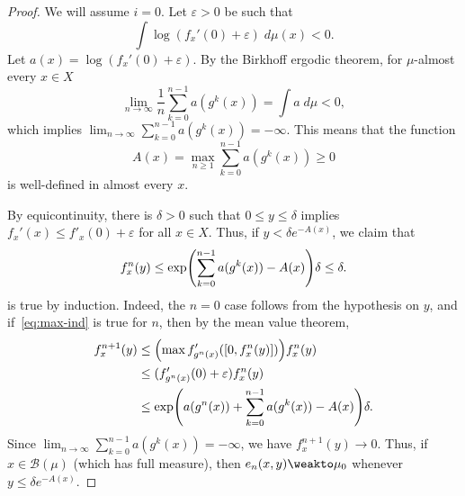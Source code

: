 \documentclass[../main]{subfiles}
\begin{document}
\begin{proof}
  We will assume \(i = 0\). Let \(\varepsilon > 0\) be such that
  \begin{equation*}
    \int \log(f_x'(0) + \varepsilon) \;d\mu(x) < 0.
  \end{equation*}
  Let \(a(x) = \log(f_x'(0) + \varepsilon)\). By the Birkhoff ergodic theorem, for \(\mu\)-almost every \(x \in X\)
  \begin{equation*}
    \lim_{n \to \infty}\frac{1}{n}\sum_{k = 0}^{n - 1} a(g^k(x)) = 
    \int a \;d\mu < 0,
  \end{equation*}
  which implies \(\lim_{n \to \infty}\sum_{k = 0}^{n - 1} a(g^k(x)) = -\infty\). This means that the function
  \begin{equation*}
    A(x) = \max_{n \geq 1}\sum_{k = 0}^{n - 1} a(g^k(x)) \geq 0
  \end{equation*}
  is well-defined in almost every \(x\).
  
  By equicontinuity, there is \(\delta>0\) such that \(0 \le y \le \delta\) implies \(f_x'(x) \le f'_x(0) + \varepsilon\) for all \(x \in X\). Thus, if \(y < \delta e^{-A(x)}\), we claim that
  \begin{equation}\label{eq:max-ind}
    f_x^n(y) \leq \exp\rpar*{\sum_{k = 0}^{n - 1}a(g^k(x)) - A(x)}\delta \leq \delta.
  \end{equation}
  is true by induction. Indeed, the \(n = 0\) case follows from the hypothesis on \(y\), and if~\eqref{eq:max-ind} is true for \(n\), then by the mean value theorem,
  \begin{align*}
    f_x^{n + 1}(y) &\leq \rpar[\Big]{\max f'_{g^{n}(x)}([0, f^n_x(y)])} f_x^n(y) \\
                   &\leq (f'_{g^{n}(x)}(0) + \varepsilon)f_x^n(y)\\
                   &\leq \exp\rpar*{a(g^{n}(x)) + \sum_{k = 0}^{n - 1}a(g^k(x)) - A(x)}\delta.
  \end{align*}
  Since \(\lim_{n \to \infty} \sum_{k = 0}^{n - 1}a(g^k(x)) = -\infty\), we have \(f_x^{n + 1}(y) \to 0\). Thus, if \(x \in \mathcal{B}(\mu)\) (which has full measure), then \(e_{n}(x,y) \weakto \mu_0\) whenever \(y \leq \delta e^{-A(x)}\).


\end{proof}
\end{document}
